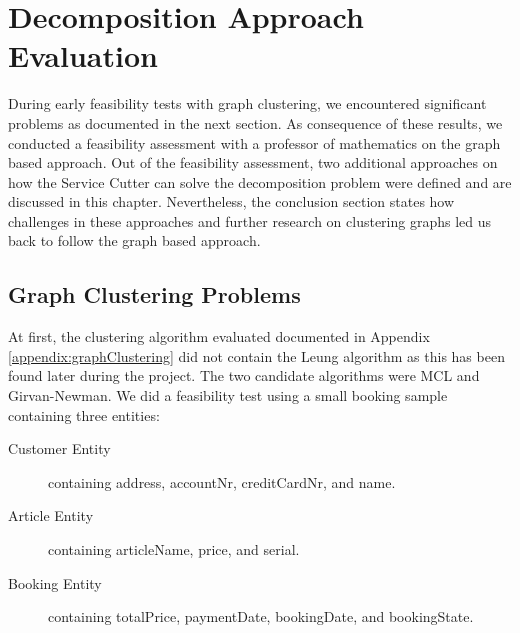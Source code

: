 \chapter{Decomposition Approach Evaluation}
\label{appendix:decompositionAppraoches}

During early feasibility tests with graph clustering, we encountered significant problems as documented in the next section. As consequence of these results, we conducted a feasibility assessment with a professor of mathematics on the graph based approach. Out of the feasibility assessment, two additional approaches on how the Service Cutter can solve the decomposition problem were defined and are discussed in this chapter. Nevertheless, the conclusion section states how challenges in these approaches and further research on clustering graphs led us back to follow the graph based approach.

\section{Graph Clustering Problems}

At first, the clustering algorithm evaluated documented in Appendix \ref{appendix:graphClustering} did not contain the Leung algorithm as this has been found later during the project. The two candidate algorithms were MCL and Girvan-Newman. We did a feasibility test using a small booking sample containing three entities:

\begin{description}
	\item[Customer Entity] containing address, accountNr, creditCardNr, and name.
	\item[Article Entity] containing articleName, price, and serial.
	\item[Booking Entity] containing totalPrice, paymentDate, bookingDate, and bookingState.
\end{description}

